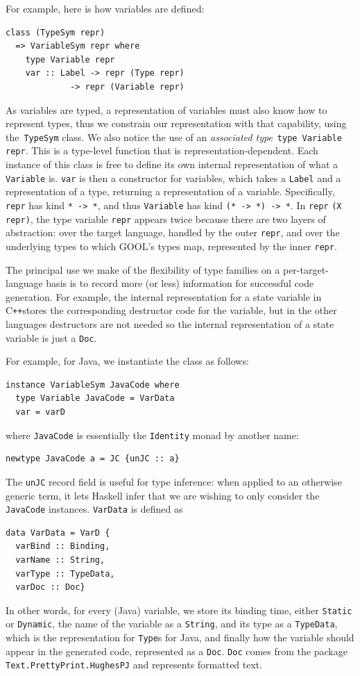 \documentclass[sigplan,review,anonymous,prologue,dvipsnames]{acmart}
\newcommand{\Cplusplus}{C\texttt{++}}
\begin{document}
For example, here is how variables are defined:
\begin{lstlisting}
class (TypeSym repr)
  => VariableSym repr where
    type Variable repr
    var :: Label -> repr (Type repr)
             -> repr (Variable repr)
\end{lstlisting}
As variables are typed, a representation of variables must also know how
to represent types, thus we constrain our representation with that capability,
using the~\verb|TypeSym| class.  We also notice the use of an
\emph{associated type}~\verb|type Variable repr|. This is a type-level
function that is representation-dependent.  Each instance of this class
is free to define its own internal representation of what a
\verb|Variable| is. \verb|var| is then a constructor for variables,
which takes a \verb|Label| and a representation of a type, returning
a representation of a variable.  Specifically, \verb|repr| has kind
\verb|* -> *|, and thus \verb|Variable| has kind \verb|(* -> *) -> *|.
In \verb|repr| \verb|(X repr)|, the type variable \verb|repr| appears
twice because there are two layers of abstraction: over the target
language, handled by the outer \verb|repr|, and over the underlying
types to which GOOL's types map, represented by the inner \verb|repr|.

The principal use we make of the flexibility of type families on a
per-target-language basis is to record more (or less) information for
successful code generation. For example, the internal representation for a 
state variable in \Cplusplus stores the corresponding destructor code for the 
variable, but in the other languages destructors are not needed so the internal 
representation of a state variable is just a \verb|Doc|.

For example, for Java, we instantiate the class as follows:
\begin{lstlisting}
instance VariableSym JavaCode where
  type Variable JavaCode = VarData
  var = varD
\end{lstlisting}
where \verb|JavaCode| is essentially the \verb|Identity| monad
by another name:
\begin{lstlisting}
newtype JavaCode a = JC {unJC :: a}
\end{lstlisting}
The \verb|unJC| record field is useful for type inference: when applied to
an otherwise generic term, it lets Haskell infer that we are wishing
to only consider the \verb|JavaCode| instances.  \verb|VarData| is defined as
\begin{lstlisting}
data VarData = VarD {
  varBind :: Binding,
  varName :: String,
  varType :: TypeData,
  varDoc :: Doc}
\end{lstlisting}
In other words, for every (Java) variable, we store its binding time, either
\verb|Static| or \verb|Dynamic|, the name of the variable as a \verb|String|,
and its type as a \verb|TypeData|, which is the representation for
\verb|Type|s for Java, and finally how the variable should appear in the
generated code, represented as a \verb|Doc|. \verb|Doc| comes from the
package \verb|Text.PrettyPrint.HughesPJ| and represents formatted text.
\end{document}

